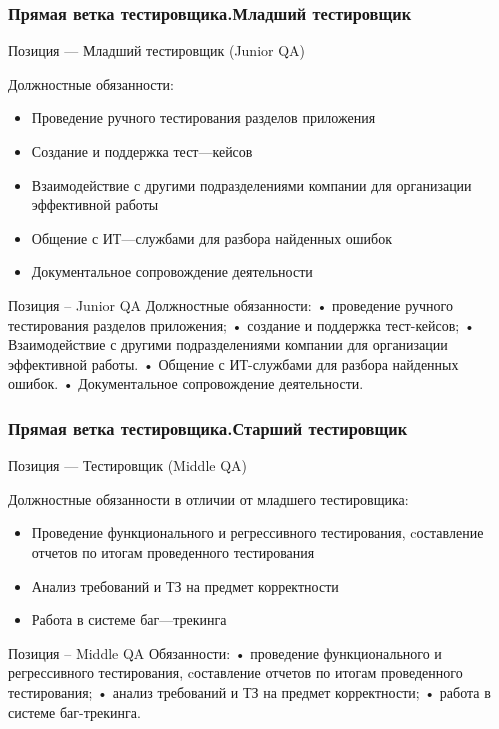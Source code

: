 \documentclass{../industrial-development}
\begin{document}
\begin{frame} \frametitle{Прямая ветка тестировщика.Младший тестировщик}
 \begin{block}{}
  \alert{Позиция --- Младший тестировщик (Junior QA)}

Должностные обязанности: 
  \end{block}
  \begin{itemize}
  \item Проведение ручного тестирования разделов приложения
  \item Создание и поддержка тест---кейсов
  \item Взаимодействие с другими подразделениями компании для организации эффективной работы
 \item Общение с ИТ---службами для разбора найденных ошибок
\item Документальное сопровождение деятельности
  \end{itemize}
\end{frame}

\lecturenotes
Позиция – Junior QA
Должностные обязанности: 
•	проведение ручного тестирования разделов приложения;
•	создание и поддержка тест-кейсов;
•	Взаимодействие с другими подразделениями компании для организации эффективной работы.
•	Общение с ИТ-службами для разбора найденных ошибок.
•	Документальное сопровождение деятельности.

\begin{frame} \frametitle{Прямая ветка тестировщика.Старший тестировщик}
 \begin{block}{}
  \alert{Позиция --- Тестировщик (Middle QA)}

Должностные обязанности в отличии от младшего тестировщика: 
  \end{block}
  \begin{itemize}
  \item Проведение функционального и регрессивного тестирования, cоставление отчетов по итогам проведенного тестирования
  \item Анализ требований и ТЗ на предмет корректности
  \item Работа в системе баг---трекинга
  \end{itemize}
\end{frame}

\lecturenotes
Позиция – Middle QA
Обязанности:
•	проведение функционального и регрессивного тестирования, cоставление отчетов по итогам проведенного тестирования;
•	анализ требований и ТЗ на предмет корректности;
•	работа в системе баг-трекинга.
\end{document}
